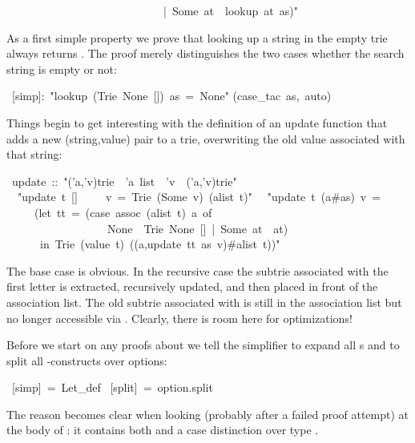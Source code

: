 \begin{isabelle}
\ \ \ \ \ \ \ \ \ \ \ \ \ \ \ \ \ \ \ \ \ \ \ \ \ \ \ \ |\ Some\ at\ {\isasymRightarrow}\ lookup\ at\ as){"}%
\begin{isamarkuptext}%
As a first simple property we prove that looking up a string in the empty
trie  always returns . The proof merely
distinguishes the two cases whether the search string is empty or not:%
\end{isamarkuptext}%
\ [simp]:\ {"}lookup\ (Trie\ None\ [])\ as\ =\ None{"}\isanewline
{}(case\_tac\ as,\ auto)%
\begin{isamarkuptext}%
Things begin to get interesting with the definition of an update function
that adds a new (string,value) pair to a trie, overwriting the old value
associated with that string:%
\end{isamarkuptext}%
\ update\ ::\ {"}('a,'v)trie\ {\isasymRightarrow}\ 'a\ list\ {\isasymRightarrow}\ 'v\ {\isasymRightarrow}\ ('a,'v)trie{"}\isanewline
{}\isanewline
\ \ {"}update\ t\ []\ \ \ \ \ v\ =\ Trie\ (Some\ v)\ (alist\ t){"}\isanewline
\ \ {"}update\ t\ (a\#as)\ v\ =\isanewline
\ \ \ \ \ (let\ tt\ =\ (case\ assoc\ (alist\ t)\ a\ of\isanewline
\ \ \ \ \ \ \ \ \ \ \ \ \ \ \ \ \ \ None\ {\isasymRightarrow}\ Trie\ None\ []\ |\ Some\ at\ {\isasymRightarrow}\ at)\isanewline
\ \ \ \ \ \ in\ Trie\ (value\ t)\ ((a,update\ tt\ as\ v)\#alist\ t)){"}%
\begin{isamarkuptext}%
\noindent
The base case is obvious. In the recursive case the subtrie
 associated with the first letter  is extracted,
recursively updated, and then placed in front of the association list.
The old subtrie associated with  is still in the association list
but no longer accessible via . Clearly, there is room here for
optimizations!

Before we start on any proofs about  we tell the simplifier to
expand all s and to split all -constructs over
options:%
\end{isamarkuptext}%
\ [simp]\ =\ Let\_def\isanewline
{}\ [split]\ =\ option.split%
\begin{isamarkuptext}%
\noindent
The reason becomes clear when looking (probably after a failed proof
attempt) at the body of : it contains both
 and a case distinction over type .


\end{isamarkuptext}
\end{isabelle}
